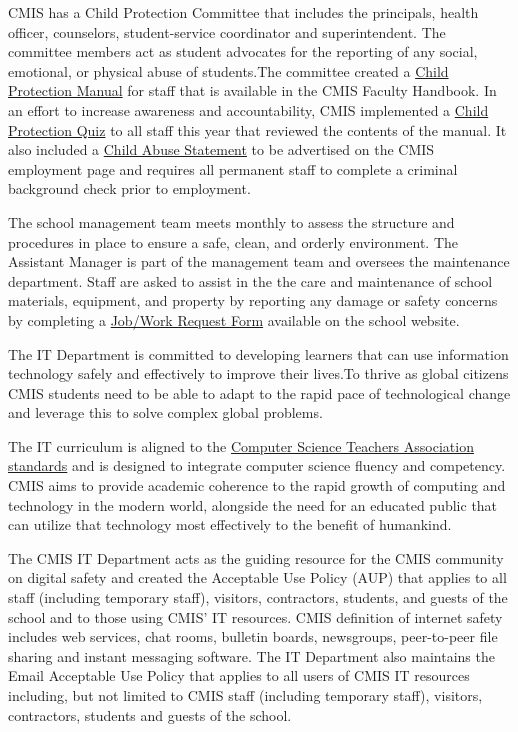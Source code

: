 \begin{findings}
CMIS has a Child Protection Committee that includes the principals, health officer, counselors, student-service coordinator and superintendent. The committee members act as student advocates for the reporting of any social, emotional, or physical abuse of students.The committee created a \href{https://docs.google.com/a/cmis.ac.th/document/d/1NtJ-Yz1ra-dug9r6BmMGqTD3tE9TFxx5W1QhBzPYlxI/edit?usp=sharing}{Child Protection Manual} for staff that is available in the CMIS Faculty Handbook. In an effort to increase awareness and accountability, CMIS implemented a \href{https://docs.google.com/a/cmis.ac.th/forms/d/185Ul5UTdsOSC8btz8CWdIvklNYs6WdPdnzb7gUrOYyM/edit}{Child Protection Quiz} to all staff this year that reviewed the contents of the manual. It also included a \href{http://cmis.ac.th/about/employment}{Child Abuse Statement} to be advertised on the CMIS employment page and requires all permanent staff to complete a criminal background check prior to employment.

The school management team meets monthly to assess the structure and procedures in place to ensure a safe, clean, and orderly environment. The Assistant Manager is part of the management team and oversees the maintenance department. Staff are asked to assist in the the care and maintenance of school materials, equipment, and property by reporting any damage or safety concerns by completing a \href{https://docs.google.com/a/cmis.ac.th/forms/d/e/1FAIpQLSe3YhMowLuZm-HuEG2v_6M2HYfOmQJ5tQG5gB2nEAksooUQNA/viewform}{Job/Work Request Form} available on the school website.

The IT Department is committed to developing learners that can use information technology safely and effectively to improve their lives.To thrive as global citizens CMIS students need to be able to adapt to the rapid pace of technological change and leverage this to solve complex global problems.

The IT curriculum is aligned to the \href{https://www.csteachers.org/}{Computer Science Teachers Association standards} and is designed to integrate computer science fluency and competency. CMIS  aims to provide academic coherence to the rapid growth of computing and technology in the modern world, alongside the need for an educated public that can utilize that technology most effectively to the benefit of humankind.

The CMIS IT Department acts as the guiding resource for the CMIS community on digital safety and created the Acceptable Use Policy (AUP) that applies to all staff (including temporary staff), visitors, contractors, students, and guests of the school and to those using CMIS' IT resources.  CMIS definition of internet safety includes web services, chat rooms, bulletin boards, newsgroups, peer-to-peer file sharing and instant messaging software.  The IT Department also maintains the Email Acceptable Use Policy that applies to all users of CMIS IT resources including, but not limited to CMIS staff (including temporary staff), visitors, contractors, students and guests of the school.  


\end{findings}
